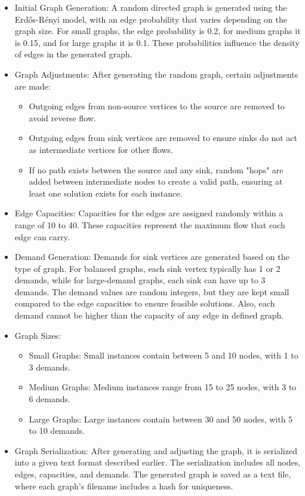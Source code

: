 \documentclass[a4paper,12pt]{article}
\begin{document}
\begin{itemize}
    \item Initial Graph Generation: A random directed graph is generated using the Erdős-Rényi model, with an edge probability that varies depending on the graph size. For small graphs, the edge probability is 0.2, for medium graphs it is 0.15, and for large graphs it is 0.1. These probabilities influence the density of edges in the generated graph.
    
    \item Graph Adjustments: After generating the random graph, certain adjustments are made:
    \begin{itemize}
        \item Outgoing edges from non-source vertices to the source are removed to avoid reverse flow.
        \item Outgoing edges from sink vertices are removed to ensure sinks do not act as intermediate vertices for other flows.
        \item If no path exists between the source and any sink, random "hops" are added between intermediate nodes to create a valid path, ensuring at least one solution exists for each instance.
    \end{itemize}
    
    \item Edge Capacities: Capacities for the edges are assigned randomly within a range of 10 to 40. These capacities represent the maximum flow that each edge can carry.
    
    \item Demand Generation: Demands for sink vertices are generated based on the type of graph. For balanced graphs, each sink vertex typically has 1 or 2 demands, while for large-demand graphs, each sink can have up to 3 demands. The demand values are random integers, but they are kept small compared to the edge capacities to ensure feasible solutions. Also, each demand cannot be higher than the capacity of any edge in defined graph.
    
    \item Graph Sizes:
    \begin{itemize}
        \item Small Graphs: Small instances contain between 5 and 10 nodes, with 1 to 3 demands.
        \item Medium Graphs: Medium instances range from 15 to 25 nodes, with 3 to 6 demands.
        \item Large Graphs: Large instances contain between 30 and 50 nodes, with 5 to 10 demands.
    \end{itemize}
    
    \item Graph Serialization: After generating and adjusting the graph, it is serialized into a given text format described earlier. The serialization includes all nodes, edges, capacities, and demands. The generated graph is saved as a text file, where each graph's filename includes a hash for uniqueness.
    
\end{itemize}
\end{document}
